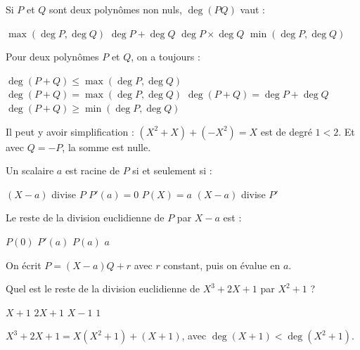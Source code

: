
\begin{question}
Si $P$ et $Q$ sont deux polynômes non nuls, $\deg(PQ)$ vaut :
\begin{reponses}
  \mauvaise $\max(\deg P,\deg Q)$
  \bonne $\deg P+\deg Q$
  \mauvaise $\deg P\times\deg Q$
  \mauvaise $\min(\deg P,\deg Q)$
\end{reponses}
\end{question}

\begin{question}
Pour deux polynômes $P$ et $Q$, on a toujours :
\begin{reponses}
  \bonne $\deg(P+Q)\le\max(\deg P,\deg Q)$
  \mauvaise $\deg(P+Q)=\max(\deg P,\deg Q)$
  \mauvaise $\deg(P+Q)=\deg P+\deg Q$
  \mauvaise $\deg(P+Q)\ge\min(\deg P,\deg Q)$
\end{reponses}
\begin{explication}
Il peut y avoir simplification : $(X^2+X)+(-X^2)=X$ est de degré $1<2$. Et avec $Q=-P$, la somme est nulle.
\end{explication}
\end{question}

\begin{question}
Un scalaire $a$ est racine de $P$ si et seulement si :
\begin{reponses}
  \bonne $(X-a)$ divise $P$
  \mauvaise $P'(a)=0$
  \mauvaise $P(X)=a$
  \mauvaise $(X-a)$ divise $P'$
\end{reponses}
\end{question}

\begin{question}
Le reste de la division euclidienne de $P$ par $X-a$ est :
\begin{reponses}
  \mauvaise $P(0)$
  \mauvaise $P'(a)$
  \bonne $P(a)$
  \mauvaise $a$
\end{reponses}
\begin{explication}
On écrit $P=(X-a)Q+r$ avec $r$ constant, puis on évalue en $a$.
\end{explication}
\end{question}

\begin{question}
Quel est le reste de la division euclidienne de $X^3+2X+1$ par $X^2+1$ ?
\begin{reponses}
  \bonne $X+1$
  \mauvaise $2X+1$
  \mauvaise $X-1$
  \mauvaise $1$
\end{reponses}
\begin{explication}
$X^3+2X+1=X(X^2+1)+(X+1)$, avec $\deg(X+1)<\deg(X^2+1)$.
\end{explication}
\end{question}

